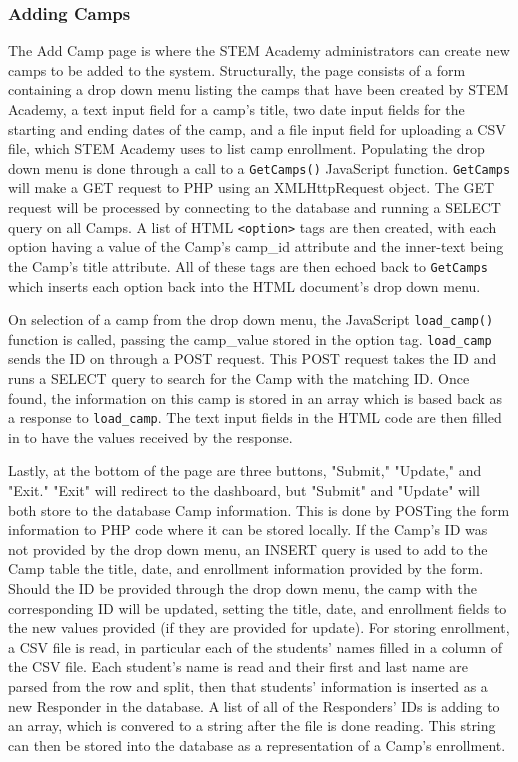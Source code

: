 \documentclass[letterpaper,10pt,serif,draftclsnofoot,onecolumn,compsoc,titlepage]{IEEEtran}
\begin{document}
\subsubsection{Adding Camps}
The Add Camp page is where the STEM Academy administrators can create new camps to be added to the system.
Structurally, the page consists of a form containing a drop down menu listing the camps that have been created by STEM Academy, a text input field for a camp's title, two date input fields for the starting and ending dates of the camp, and a file input field for uploading a CSV file, which STEM Academy uses to list camp enrollment.
Populating the drop down menu is done through a call to a \texttt{GetCamps()} JavaScript function.
\texttt{GetCamps} will make a GET request to PHP using an XMLHttpRequest object.
The GET request will be processed by connecting to the database and running a SELECT query on all Camps.
A list of HTML \texttt{<option>} tags are then created, with each option having a value of the Camp's camp\_id attribute and the inner-text being the Camp's title attribute.
All of these tags are then echoed back to \texttt{GetCamps} which inserts each option back into the HTML document's drop down menu.

On selection of a camp from the drop down menu, the JavaScript \texttt{load\_camp()} function is called, passing the camp\_value stored in the option tag.
\texttt{load\_camp} sends the ID on through a POST request.
This POST request takes the ID and runs a SELECT query to search for the Camp with the matching ID.
Once found,  the information on this camp is stored in an array which is based back as a response to \texttt{load\_camp}.
The text input fields in the HTML code are then filled in to have the values received by the response.

Lastly, at the bottom of the page are three buttons, "Submit," "Update," and "Exit."
"Exit" will redirect to the dashboard, but "Submit" and "Update" will both store to the database Camp information.
This is done by POSTing the form information to PHP code where it can be stored locally.
If the Camp's ID was not provided by the drop down menu, an INSERT query is used to add to the Camp table the title, date, and enrollment information provided by the form.
Should the ID be provided through the drop down menu, the camp with the corresponding ID will be updated, setting the title, date, and enrollment fields to the new values provided (if they are provided for update).
For storing enrollment, a CSV file is read, in particular each of the students' names filled in a column of the CSV file.
Each student's name is read and their first and last name are parsed from the row and split, then that students' information is inserted as a new Responder in the database.
A list of all of the Responders' IDs is adding to an array, which is convered to a string after the file is done reading.
This string can then be stored into the database as a representation of a Camp's enrollment.
\end{document}
